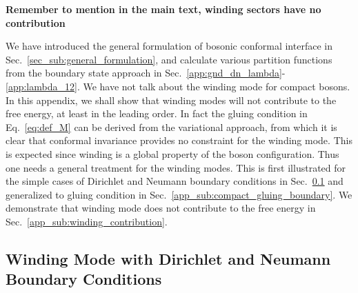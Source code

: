 {\bf\color{red}Remember to mention in the main text, winding sectors have no contribution}

We have introduced the general formulation of bosonic conformal interface in Sec.~\ref{sec_sub:general_formulation}, and calculate various partition functions from the boundary state approach in Sec.~\ref{app:gnd_dn_lambda}-\ref{app:lambda_12}. We have not talk about the winding mode for compact bosons. In this appendix, we shall show that winding modes will not contribute to the free energy, at least in the leading order. In fact the gluing condition in Eq.~\eqref{eq:def_M} can be derived from the variational approach\cite{blumenhagen_introduction_2009,bachas_permeable_2002}, from which it is clear that conformal invariance provides no constraint for the winding mode. This is expected since winding is a global property of the boson configuration. Thus one needs a general treatment for the winding modes. This is first illustrated for the simple cases of Dirichlet and Neumann boundary conditions in Sec.~\ref{app_sub:compact_DN_boundary} and generalized to gluing condition in Sec.~\ref{app_sub:compact_gluing_boundary}. We demonstrate that winding mode does not contribute to the free energy in Sec.~\ref{app_sub:winding_contribution}. 


\subsection{Winding Mode with Dirichlet and Neumann Boundary Conditions}
\label{app_sub:compact_DN_boundary}

